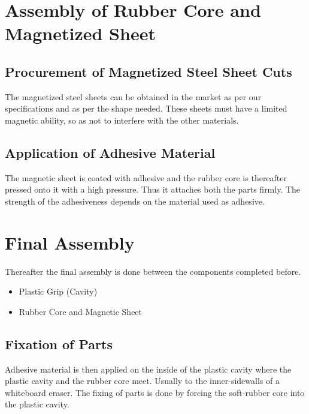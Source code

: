 \documentclass[12pt,a4paper,oneside]{article}
\begin{document}
\newpage

\newpage


\section{Assembly of Rubber Core and Magnetized Sheet}

\subsection{Procurement of Magnetized Steel Sheet Cuts}
The magnetized steel sheets can be obtained in the market as per our specifications and as per the shape needed. These sheets must have a limited magnetic ability, so as not to interfere with the other materials. 

\subsection{Application of Adhesive Material}
The magnetic sheet is coated with adhesive and the rubber core is thereafter pressed onto it with a high pressure. Thus it attaches both the parts firmly. The strength of the adhesiveness depends on the material used as adhesive. 


\newpage

\section{Final Assembly}
Thereafter the final assembly is done between the components completed before.
\begin{itemize}
    \item Plastic Grip (Cavity)
    \item Rubber Core and Magnetic Sheet
\end{itemize}

\subsection{Fixation of Parts}
Adhesive material is then applied on the inside of the plastic cavity where the plastic cavity and the rubber core meet. Usually to the inner-sidewalls of a whiteboard eraser. The fixing of parts is done by forcing the soft-rubber core into the plastic cavity. 



\clearpage
{}
\printbibliography
\end{document}
